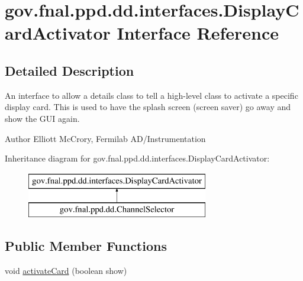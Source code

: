 \hypertarget{interfacegov_1_1fnal_1_1ppd_1_1dd_1_1interfaces_1_1DisplayCardActivator}{\section{gov.\-fnal.\-ppd.\-dd.\-interfaces.\-Display\-Card\-Activator Interface Reference}
\label{interfacegov_1_1fnal_1_1ppd_1_1dd_1_1interfaces_1_1DisplayCardActivator}
}


\subsection{Detailed Description}
An interface to allow a details class to tell a high-\/level class to activate a specific display card. This is used to have the splash screen (screen saver) go away and show the G\-U\-I again.

\begin{DoxyAuthor}{Author}
Elliott Mc\-Crory, Fermilab A\-D/\-Instrumentation 
\end{DoxyAuthor}
Inheritance diagram for gov.\-fnal.\-ppd.\-dd.\-interfaces.\-Display\-Card\-Activator\-:\begin{figure}[H]
\begin{center}
\leavevmode
\includegraphics[height=2.000000cm]{interfacegov_1_1fnal_1_1ppd_1_1dd_1_1interfaces_1_1DisplayCardActivator}
\end{center}
\end{figure}
\subsection*{Public Member Functions}
\begin{DoxyCompactItemize}
\item 
void \hyperlink{interfacegov_1_1fnal_1_1ppd_1_1dd_1_1interfaces_1_1DisplayCardActivator_a76f499c19694618b4cd1830a65c56783}{activate\-Card} (boolean show)
\end{DoxyCompactItemize}


